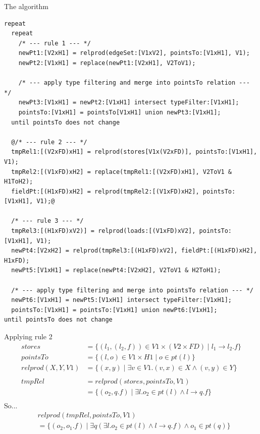 \documentclass{beamer}
\begin{document}
\begin{frame}[fragile]{The algorithm}
\begin{lstlisting}[style=base]
repeat
  repeat
    /* --- rule 1 --- */
    newPt1:[V2xH1] = relprod(edgeSet:[V1xV2], pointsTo:[V1xH1], V1);
    newPt2:[V1xH1] = replace(newPt1:[V2xH1], V2ToV1);

    /* --- apply type filtering and merge into pointsTo relation --- */
    newPt3:[V1xH1] = newPt2:[V1xH1] intersect typeFilter:[V1xH1];
    pointsTo:[V1xH1] = pointsTo[V1xH1] union newPt3:[V1xH1];
  until pointsTo does not change

  @/* --- rule 2 --- */
  tmpRel1:[(V2xFD)xH1] = relprod(stores[V1x(V2xFD)], pointsTo:[V1xH1], V1);
  tmpRel2:[(V1xFD)xH2] = replace(tmpRel1:[(V2xFD)xH1], V2ToV1 & H1ToH2);
  fieldPt:[(H1xFD)xH2] = relprod(tmpRel2:[(V1xFD)xH2], pointsTo:[V1xH1], V1);@

  /* --- rule 3 --- */
  tmpRel3:[(H1xFD)xV2)] = relprod(loads:[(V1xFD)xV2], pointsTo:[V1xH1], V1);
  newPt4:[V2xH2] = relprod(tmpRel3:[(H1xFD)xV2], fieldPt:[(H1xFD)xH2], H1xFD);
  newPt5:[V1xH1] = replace(newPt4:[V2xH2], V2ToV1 & H2ToH1);

  /* --- apply type filtering and merge into pointsTo relation --- */
  newPt6:[V1xH1] = newPt5:[V1xH1] intersect typeFilter:[V1xH1];
  pointsTo:[V1xH1] = pointsTo:[V1xH1] union newPt6:[V1xH1];
until pointsTo does not change
\end{lstlisting}
\end{frame} 

\begin{frame}{Applying rule 2}
\begin{align*}
stores &= \{ (l_1, (l_2, f)) \in V1 \times (V2 \times FD) \mid l_1 \rightarrow l_2.f \} \\
pointsTo &= \{ (l, o) \in V1 \times H1 \mid o \in pt(l) \} \\
relprod(X, Y, V1) &= \{(x, y) \mid \exists v \in V1.(v, x) \in X \wedge (v, y) \in Y\} \\
\\
tmpRel &= relprod(stores, pointsTo, V1) \\
       &= \{ (o_2, q.f) \mid \exists l. o_2 \in pt(l) \wedge l \rightarrow q.f \} \\
\end{align*}
So...
\begin{align*}
&relprod(tmpRel, pointsTo, V1) \\&= \{ (o_2, o_1.f) \mid \exists q (\exists l. o_2 \in pt(l) \wedge l \rightarrow q.f) \wedge o_1 \in pt(q) \}
\end{align*}
\end{frame}
\end{document}
